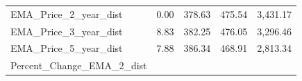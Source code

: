 \documentclass[]{article}
\begin{document}
\begin{longtable}[]{@{}lllll@{}}
\begin{minipage}[t]{0.49\columnwidth}
EMA\_Price\_2\_year\_dist\strut
\end{minipage} & \begin{minipage}[t]{0.08\columnwidth}\raggedright\strut
0.00\strut
\end{minipage} & \begin{minipage}[t]{0.09\columnwidth}\raggedright\strut
378.63\strut
\end{minipage} & \begin{minipage}[t]{0.09\columnwidth}\raggedright\strut
475.54\strut
\end{minipage} & \begin{minipage}[t]{0.11\columnwidth}\raggedright\strut
3,431.17\strut
\end{minipage}\tabularnewline
\begin{minipage}[t]{0.49\columnwidth}\raggedright\strut
EMA\_Price\_3\_year\_dist\strut
\end{minipage} & \begin{minipage}[t]{0.08\columnwidth}\raggedright\strut
8.83\strut
\end{minipage} & \begin{minipage}[t]{0.09\columnwidth}\raggedright\strut
382.25\strut
\end{minipage} & \begin{minipage}[t]{0.09\columnwidth}\raggedright\strut
476.05\strut
\end{minipage} & \begin{minipage}[t]{0.11\columnwidth}\raggedright\strut
3,296.46\strut
\end{minipage}\tabularnewline
\begin{minipage}[t]{0.49\columnwidth}\raggedright\strut
EMA\_Price\_5\_year\_dist\strut
\end{minipage} & \begin{minipage}[t]{0.08\columnwidth}\raggedright\strut
7.88\strut
\end{minipage} & \begin{minipage}[t]{0.09\columnwidth}\raggedright\strut
386.34\strut
\end{minipage} & \begin{minipage}[t]{0.09\columnwidth}\raggedright\strut
468.91\strut
\end{minipage} & \begin{minipage}[t]{0.11\columnwidth}\raggedright\strut
2,813.34\strut
\end{minipage}\tabularnewline
\begin{minipage}[t]{0.49\columnwidth}\raggedright\strut
Percent\_Change\_EMA\_2\_dist\strut

\end{minipage}
\end{longtable}
\end{document}
